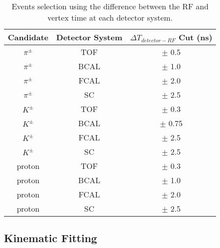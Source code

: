 \begin{table}[H]
    \centering
    \small
    \caption{Events selection using the difference between the RF and vertex time at each detector system.}
    \label{tab.evt_sel.pid_tim_sel}
    \begin{tabular}{|c|c|c|}
        \hline
        Candidate & Detector System & $\Delta T_{detector-RF}$ Cut (ns) \\
        \hline
        $\pi^{\pm}$ & TOF & $\pm$ 0.5 \\
        \hline
        $\pi^{\pm}$ & BCAL & $\pm$ 1.0 \\
        \hline
        $\pi^{\pm}$ & FCAL & $\pm$ 2.0 \\
        \hline
        $\pi^{\pm}$ & SC & $\pm$ 2.5 \\
        \hline
        $K^{\pm}$ & TOF &  $\pm$ 0.3 \\
        \hline
        $K^{\pm}$ & BCAL & $\pm$ 0.75 \\
        \hline
        $K^{\pm}$ & FCAL & $\pm$ 2.5 \\
        \hline
        $K^{\pm}$ & SC & $\pm$ 2.5 \\
        \hline
        proton & TOF & $\pm$ 0.3 \\
        \hline
        proton & BCAL & $\pm$ 1.0 \\
        \hline
        proton & FCAL & $\pm$ 2.0 \\
        \hline
        proton & SC & $\pm$ 2.5 \\
        \hline
    \end{tabular}
\end{table}

\subsection{Kinematic Fitting}
\label{sec.evt_sel.kin_fit}

